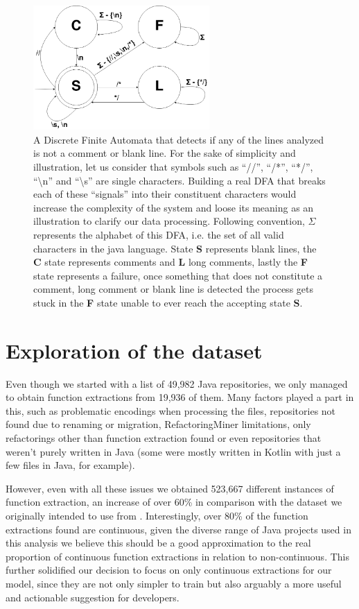 \begin{figure}[!ht]
\centerline{\includegraphics[width=0.6\textwidth]{figuras/DFA.png}   }
\caption{A Discrete Finite Automata that detects if any of the lines analyzed is not a comment or blank line. For the sake of simplicity and illustration, let us consider that symbols such as ``//'', ``/*'', ``*/'', ``\textbackslash n'' and ``\textbackslash s'' are single characters. Building a real DFA that breaks each of these ``signals'' into their constituent characters would increase the complexity of the system and loose its meaning as an illustration to clarify our data processing.
Following convention, $\Sigma$ represents the alphabet of this DFA, i.e. the set of all valid characters in the java language. State \textbf{S} represents blank lines, the \textbf{C} state represents comments and \textbf{L} long comments, lastly the \textbf{F} state represents a failure, once something that does not constitute a comment, long comment or blank line is detected the process gets stuck in the \textbf{F} state unable to ever reach the accepting state 
\textbf{S}.}
\label{img:dfa}
\end{figure}

\section{Exploration of the dataset}

Even though we started with a list of 49,982 Java repositories, we only managed to obtain function extractions from 19,936 of them. Many factors played a part in this, such as problematic encodings when processing the files, repositories not found due to renaming or migration, RefactoringMiner limitations, only refactorings other than function extraction found or even repositories that weren't purely written in Java (some were mostly written in Kotlin with just a few files in Java, for example).

However, even with all these issues we obtained 523,667 different instances of function extraction, an increase of over 60\% in comparison with the dataset we originally intended to use from \citet{mauricio_paper}. Interestingly, over 80\% of the function extractions found  are continuous, given the diverse range of Java projects used in this analysis we believe this should be a good approximation to the real proportion of continuous function extractions in relation to non-continuous. This further solidified our decision to focus on only continuous extractions for our model, since they are not only simpler to train but also arguably a more useful and actionable suggestion for developers.



